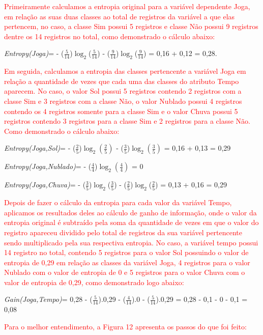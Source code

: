 \par
\textcolor{red}{Primeiramente calculamos a entropia original para a variável dependente Joga, em relação as suas duas classes ao total de registros da variável a que elas pertencem, no caso, a classe Sim possui 5 registros e classe Não possui 9 registros dentre os 14 registros no total, como demonstrado o cálculo abaixo:}

\textit{Entropy(Joga)}={ - ($\frac{5}{14}$)$\log_{2}$($\frac{5}{14}$) - ($\frac{9}{14}$)$\log_{2}$($\frac{9}{14}$) = 0,16 + 0,12 = 0,28.}

\par
\textcolor{red}{Em seguida, calculamos a entropia das classes pertencente a variável Joga em relação a quantidade de vezes que cada uma das classes do atributo Tempo aparecem. No caso, o valor Sol possui 5 registros contendo 2 registros com a classe Sim e 3 registros com a classe Não, o valor Nublado possui 4 registros contendo os 4 registros somente para a classe Sim e o valor Chuva possui 5 registros contendo 3 registros para a classe Sim e 2 registros para a classe Não. Como demonstrado o cálculo abaixo:}

\textit{Entropy(Joga,Sol)}={ - ($\frac{2}{5}$)$\log_{2}(\frac{2}{5})$ - ($\frac{3}{5}$)$\log_{2}(\frac{3}{5})$ = 0,16 + 0,13 = 0,29}

\textit{Entropy(Joga,Nublado)}={ - ($\frac{4}{4}$)$\log_{2}(\frac{4}{4})$ = 0}

\textit{Entropy(Joga,Chuva)}={ - ($\frac{3}{5}$)$\log_{2}$($\frac{3}{5}$) - ($\frac{2}{5}$)$\log_{2}$($\frac{2}{5}$) = 0,13 + 0,16 = 0,29} 

\par
\textcolor{red}{Depois de fazer o cálculo da entropia para cada valor da variável Tempo, aplicamos os resultados deles ao cálculo de ganho de informação, onde o valor da entropia original é subtraído pela soma da quantidade de vezes em que o valor do registro apareceu dividido pelo total de registros da sua variável pertencente sendo multiplicado pela sua respectiva entropia. No caso, a variável tempo possui 14 registro no total, contendo 5 registros para o valor Sol possuindo o valor de entropia de 0,29 em relação as classes da variável Joga, 4 registros para o valor Nublado com o valor de entropia de 0 e 5 registros para o valor Chuva com o valor de entropia de 0,29, como demonstrado logo abaixo:}

\textit{Gain(Joga,Tempo)}={ 0,28 - ($\frac{5}{14}$).0,29 - ($\frac{4}{14}$).0 - ($\frac{5}{14}$).0,29 = 0,28 - 0,1 - 0 - 0,1 = 0,08} 
\par
\textcolor{red}{Para o melhor entendimento, a Figura 12 apresenta os passos do que foi feito:}

